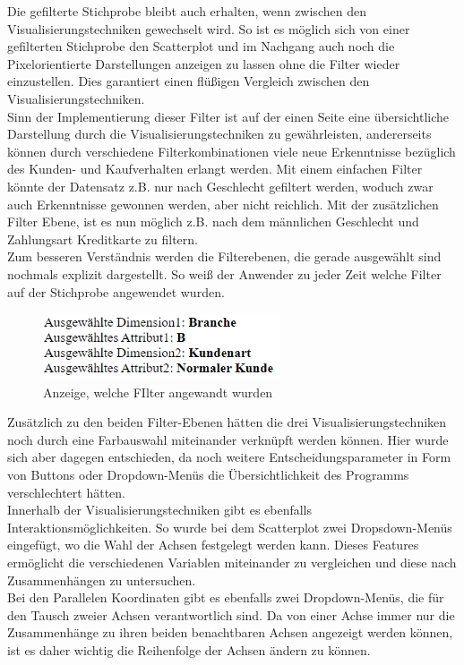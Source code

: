 \documentclass[usegeometry=true]{scrartcl}
\begin{document}
\noindent Die gefilterte Stichprobe bleibt auch erhalten, wenn zwischen den Visualisierungstechniken gewechselt wird. So ist es möglich sich von einer gefilterten Stichprobe den
Scatterplot und im Nachgang auch noch die Pixelorientierte Darstellungen anzeigen zu lassen ohne die Filter wieder einzustellen. Dies garantiert einen flüßigen Vergleich
zwischen den Visualisierungstechniken.\\
Sinn der Implementierung dieser Filter ist auf der einen Seite eine übersichtliche Darstellung durch die Visualisierungstechniken zu gewährleisten,
andererseits können durch verschiedene Filterkombinationen viele neue Erkenntnisse bezüglich des Kunden- und Kaufverhalten erlangt werden. Mit einem einfachen Filter könnte
der Datensatz z.B. nur nach Geschlecht gefiltert werden, woduch zwar auch Erkenntnisse gewonnen werden, aber nicht reichlich. Mit der zusätzlichen Filter Ebene, ist es nun
möglich z.B. nach dem männlichen Geschlecht und Zahlungsart Kreditkarte zu filtern. \\
Zum besseren Verständnis werden die Filterebenen, die gerade ausgewählt sind nochmals explizit dargestellt. So weiß der Anwender zu jeder Zeit welche Filter auf der Stichprobe
angewendet wurden.
\begin{figure} [H]
	\begin{center}
		\includegraphics[width=7cm]{IMG/Filteranzeige}
		\caption{Anzeige, welche FIlter angewandt wurden}
		\label{fig:Filteranzeige}
	\end{center}
\end{figure}
\noindent Zusätzlich zu den beiden Filter-Ebenen hätten die drei Visualisierungstechniken noch durch eine Farbauswahl miteinander verknüpft werden können. Hier wurde sich aber dagegen
entschieden, da noch weitere Entscheidungsparameter in Form von Buttons oder Dropdown-Menüs die Übersichtlichkeit des Programms verschlechtert hätten.\\
\noindent Innerhalb der Visualisierungstechniken gibt es ebenfalls Interaktionsmöglichkeiten. So wurde bei dem Scatterplot zwei Dropsdown-Menüs eingefügt, wo die Wahl der Achsen
festgelegt werden kann. Dieses Features ermöglicht die verschiedenen Variablen miteinander zu vergleichen und diese nach Zusammenhängen zu untersuchen.\\
Bei den Parallelen Koordinaten gibt es ebenfalls zwei Dropdown-Menüs, die für den Tausch zweier Achsen verantwortlich sind. Da von einer Achse immer nur die Zusammenhänge zu
ihren beiden benachtbaren Achsen angezeigt werden können, ist es daher wichtig die Reihenfolge der Achsen ändern zu können.
\end{document}
